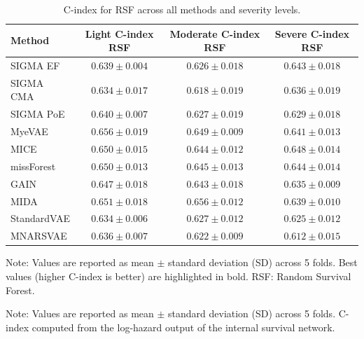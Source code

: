\documentclass[final,3p,times,authoryear]{elsarticle}
\begin{document}
\begin{table}[!t]
\centering
{}
\caption{C-index for RSF across all methods and severity levels.}
\label{tab:survival}
\begin{tabular}{lccc}
\toprule
Method & Light C-index RSF & Moderate C-index RSF & Severe C-index RSF \\
\midrule
SIGMA EF & $0.639 \pm 0.004$ & $0.626 \pm 0.018$ & $0.643 \pm 0.018$ \\
SIGMA CMA & $0.634 \pm 0.017$ & $0.618 \pm 0.019$ & $0.636 \pm 0.019$ \\
SIGMA PoE & $0.640 \pm 0.007$ & $0.627 \pm 0.019$ & $0.629 \pm 0.018$ \\
MyeVAE & $\mathbf{0.656 \pm 0.019}$ & $0.649 \pm 0.009$ & $0.641 \pm 0.013$ \\
MICE & $0.650 \pm 0.015$ & $0.644 \pm 0.012$ & $\mathbf{0.648 \pm 0.014}$ \\
missForest & $0.650 \pm 0.013$ & $0.645 \pm 0.013$ & $0.644 \pm 0.014$ \\
GAIN & $0.647 \pm 0.018$ & $0.643 \pm 0.018$ & $0.635 \pm 0.009$ \\
MIDA & $0.651 \pm 0.018$ & $\mathbf{0.656 \pm 0.012}$ & $0.639 \pm 0.010$ \\
StandardVAE & $0.634 \pm 0.006$ & $0.627 \pm 0.012$ & $0.625 \pm 0.012$ \\
MNARSVAE & $0.636 \pm 0.007$ & $0.622 \pm 0.009$ & $0.612 \pm 0.015$ \\
\bottomrule
\end{tabular}

\vspace{1ex}
\footnotesize{Note: Values are reported as mean $\pm$ standard deviation (SD) across 5 folds. Best values (higher C-index is better) are highlighted in bold. RSF: Random Survival Forest.}
\end{table}

\begin{table}[!t]
\centering
{}
\caption{Direct survival C-index from the internal Cox head (severe missingness, independent condition). Only methods with an internal Cox head are included.}
\label{tab:direct_survival}

\vspace{1ex}
\footnotesize{Note: Values are reported as mean $\pm$ standard deviation (SD) across 5 folds. C-index computed from the log-hazard output of the internal survival network.}
\end{table}
\end{document}
